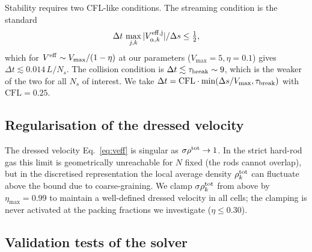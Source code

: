 \documentclass[aps,pre,twocolumn,superscriptaddress,longbibliography,floatfix]{revtex4-2}
\begin{document}
Stability requires two CFL-like conditions. The streaming
condition is the standard
\begin{equation}
\Delta t\,\max_{j,k} |V^{\rm eff,j}_{\alpha,k}|/\Delta s \leq
\tfrac12,
\end{equation}
which for $V^{\rm eff}\sim V_{\max}/(1-\eta)$ at our parameters
($V_{\max}=5,\eta=0.1$) gives $\Delta t\lesssim 0.014\,L/N_s$.
The collision condition is
$\Delta t \lesssim \tau_{\rm break}\sim 9$, which is the
weaker of the two for all $N_s$ of interest. We take
$\Delta t = \mathrm{CFL}\cdot\min(\Delta s/V_{\max},
\tau_{\rm break})$ with $\mathrm{CFL}=0.25$.

\subsection{Regularisation of the dressed velocity}

The dressed velocity Eq.~\eqref{eq:veff} is singular as
$\sigma\rho^{\rm tot}\to 1$. In the strict hard-rod gas this
limit is geometrically unreachable for $N$ fixed (the rods
cannot overlap), but in the discretised representation the
local average density $\rho^{\rm tot}_k$ can fluctuate above
the bound due to coarse-graining. We clamp
$\sigma\rho^{\rm tot}_k$ from above by $\eta_{\max}=0.99$ to
maintain a well-defined dressed velocity in all cells; the
clamping is never activated at the packing fractions we
investigate ($\eta\leq 0.30$).

\subsection{Validation tests of the solver}
\end{document}
